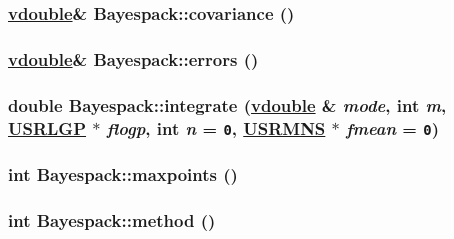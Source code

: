\hypertarget{classBayespack_a19}{
\subsubsection[covariance]{\setlength{\rightskip}{0pt plus 5cm}\hyperlink{PoissonGammaFit_8hpp_a0}{vdouble}\& Bayespack::covariance ()}}
\label{classBayespack_a19}


\hypertarget{classBayespack_a18}{
\subsubsection[errors]{\setlength{\rightskip}{0pt plus 5cm}\hyperlink{PoissonGammaFit_8hpp_a0}{vdouble}\& Bayespack::errors ()}}
\label{classBayespack_a18}


\hypertarget{classBayespack_a16}{
\subsubsection[integrate]{\setlength{\rightskip}{0pt plus 5cm}double Bayespack::integrate (\hyperlink{PoissonGammaFit_8hpp_a0}{vdouble} \& {\em mode}, int {\em m}, \hyperlink{Bayespack_8hpp_a3}{USRLGP} $\ast$ {\em flogp}, int {\em n} = {\tt 0}, \hyperlink{Bayespack_8hpp_a4}{USRMNS} $\ast$ {\em fmean} = {\tt 0})}}
\label{classBayespack_a16}


\hypertarget{classBayespack_a8}{
\subsubsection[maxpoints]{\setlength{\rightskip}{0pt plus 5cm}int Bayespack::maxpoints ()}}
\label{classBayespack_a8}


\hypertarget{classBayespack_a11}{
\subsubsection[method]{\setlength{\rightskip}{0pt plus 5cm}int Bayespack::method ()}}
\label{classBayespack_a11}


